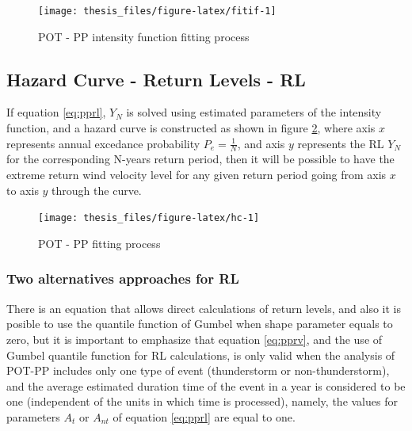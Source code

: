 \documentclass[12pt,oneside]{reedthesis}
\begin{document}
\footnotesize
\begin{figure}

{\centering \texttt{[image: thesis\_files/figure-latex/fitif-1]} 

}

\caption{POT - PP intensity function fitting process}\label{fig:fitif}
\end{figure}
\normalsize

\hypertarget{hazard-curve---return-levels---rl}{%
\subsection{Hazard Curve - Return Levels - RL}\label{hazard-curve---return-levels---rl}}

If equation \eqref{eq:pprl}, \(Y_N\) is solved using estimated parameters of the intensity function, and a hazard curve is constructed as shown in figure \ref{fig:hc}, where axis \(x\) represents annual excedance probability \(P_e = \frac{1}{N}\), and axis \(y\) represents the RL \(Y_N\) for the corresponding N-years return period, then it will be possible to have the extreme return wind velocity level for any given return period going from axis \(x\) to axis \(y\) through the curve.

\footnotesize
\begin{figure}

{\centering \texttt{[image: thesis\_files/figure-latex/hc-1]} 

}

\caption{POT - PP fitting process}\label{fig:hc}
\end{figure}
\normalsize

\hypertarget{two-alternatives-approaches-for-rl}{%
\subsubsection{Two alternatives approaches for RL}\label{two-alternatives-approaches-for-rl}}

There is an equation that allows direct calculations of return levels, and also it is posible to use the quantile function of Gumbel when shape parameter equals to zero, but it is important to emphasize that equation \eqref{eq:pprv}, and the use of Gumbel quantile function for RL calculations, is only valid when the analysis of POT-PP includes only one type of event (thunderstorm or non-thunderstorm), and the average estimated duration time of the event in a year is considered to be one (independent of the units in which time is processed), namely, the values for parameters \(A_t\) or \(A_{nt}\) of equation \eqref{eq:pprl} are equal to one.
\end{document}
